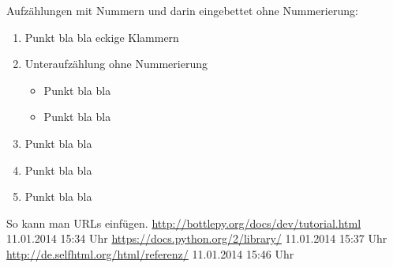 Aufzählungen mit Nummern und darin eingebettet ohne Nummerierung:

\begin{enumerate}
\item Punkt bla bla \lbrack eckige Klammern \rbrack 
\item Unteraufzählung ohne Nummerierung
\begin{itemize}
\item Punkt bla bla
\item Punkt bla bla
\end{itemize}
\item Punkt bla bla
\item Punkt bla bla
\item Punkt bla bla
\end{enumerate}

So kann man URLs einfügen.
\url{http://bottlepy.org/docs/dev/tutorial.html} 11.01.2014 15:34 Uhr\newline
\url{https://docs.python.org/2/library/} 11.01.2014 15:37 Uhr\newline
\url{http://de.selfhtml.org/html/referenz/} 11.01.2014 15:46 Uhr

